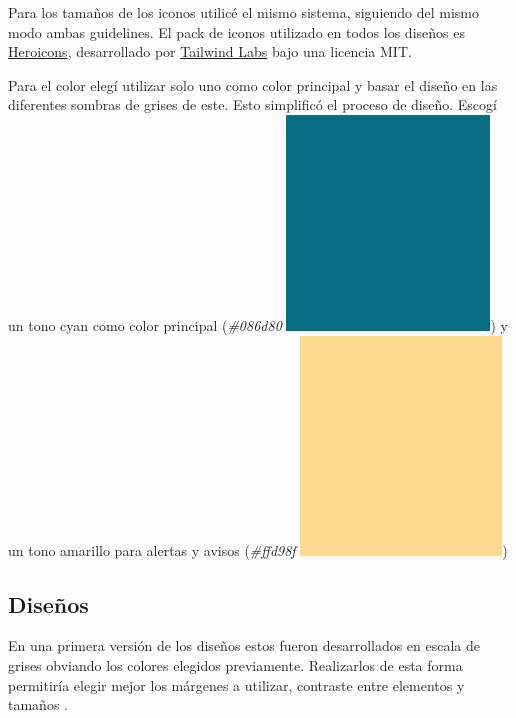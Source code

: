 Para los tamaños de los iconos utilicé el mismo sistema, siguiendo del mismo modo ambas guidelines. El pack de iconos utilizado en todos los diseños es \href{https://heroicons.com/}{Heroicons}, desarrollado por \href{https://github.com/tailwindlabs}{Tailwind Labs} bajo una licencia MIT.

Para el color elegí utilizar solo uno como color principal y basar el diseño en las diferentes sombras de grises de este. Esto simplificó el proceso de diseño. Escogí un tono cyan como color principal (\textit{\#086d80} \includegraphics[height=\fontcharht\font`\B]{diseno/app/presentacion/color.png}) y un tono amarillo para alertas y avisos (\textit{\#ffd98f} \includegraphics[height=\fontcharht\font`\B]{diseno/app/presentacion/amarillo.png})

\subsection{Diseños}

En una primera versión de los diseños estos fueron desarrollados en escala de grises obviando los colores elegidos previamente. Realizarlos de esta forma permitiría elegir mejor los márgenes a utilizar, contraste entre elementos y tamaños \cite[p.~13]{refactoring-ui}. 

